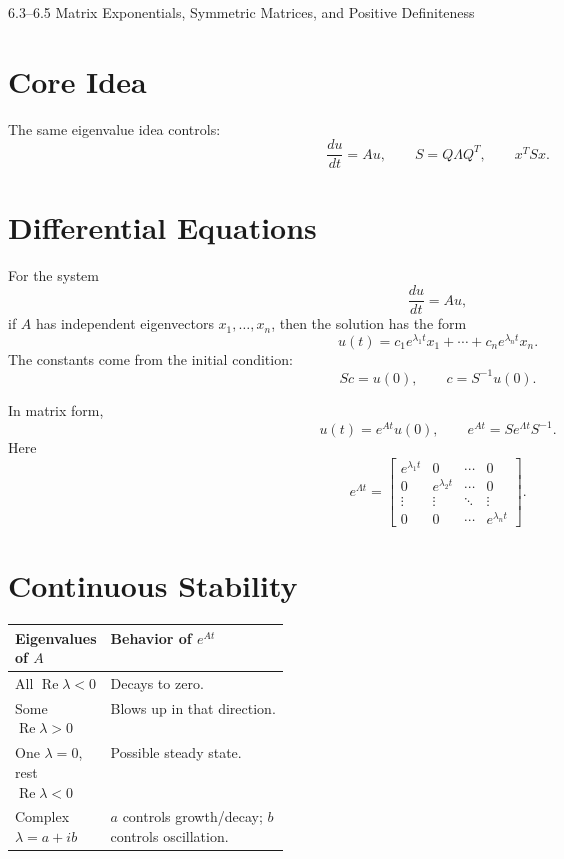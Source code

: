 \documentclass[10pt]{article}
\begin{document}
\begin{center}
{\LARGE 6.3--6.5 Matrix Exponentials, Symmetric Matrices, and Positive Definiteness\par}
\end{center}

\section{Core Idea}


The same eigenvalue idea controls:
\[
\frac{du}{dt}=Au,
\qquad
S=Q\Lambda Q^{T},
\qquad
x^{T}Sx.
\]

\section{Differential Equations}

For the system
\[
\frac{du}{dt}=Au,
\]
if \(A\) has independent eigenvectors \(x_1,\ldots,x_n\), then the solution has the form
\[
u(t)=c_1e^{\lambda_1t}x_1+\cdots+c_ne^{\lambda_nt}x_n.
\]
The constants come from the initial condition:
\[
Sc=u(0),
\qquad
c=S^{-1}u(0).
\]

In matrix form,
\[
u(t)=e^{At}u(0),
\qquad
e^{At}=Se^{\Lambda t}S^{-1}.
\]
Here
\[
e^{\Lambda t}=
\begin{bmatrix}
e^{\lambda_1t}&0&\cdots&0\\
0&e^{\lambda_2t}&\cdots&0\\
\vdots&\vdots&\ddots&\vdots\\
0&0&\cdots&e^{\lambda_nt}
\end{bmatrix}.
\]

\section{Continuous Stability}

\begin{center}
\small
\begin{tabularx}{\linewidth}{@{}L{0.32\linewidth}Y@{}}
\toprule
Eigenvalues of \(A\) & Behavior of \(e^{At}\) \\
\midrule
All \(\operatorname{Re}\lambda<0\) & Decays to zero. \\
Some \(\operatorname{Re}\lambda>0\) & Blows up in that direction. \\
One \(\lambda=0\), rest \(\operatorname{Re}\lambda<0\) & Possible steady state. \\
Complex \(\lambda=a+ib\) & \(a\) controls growth/decay; \(b\) controls oscillation. \\
\bottomrule
\end{tabularx}
\end{center}
\end{document}
